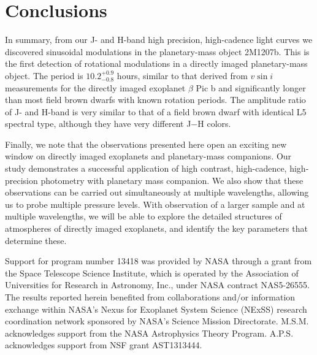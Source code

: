\documentclass[apj]{emulateapj}
\newcommand{\bpic}{$\beta$ Pic}
\newcommand{\vsini}{$v\sin i$}
\begin{document}
\section{Conclusions}
In summary, from our J- and H-band high precision, high-cadence light
curves we discovered sinusoidal modulations in the planetary-mass
object 2M1207b. This is the first detection of rotational modulations
in a directly imaged planetary-mass object.  The period is
$10.2^{+0.9}_{-0.8}$ hours, similar to that derived from \vsini{} 
measurements for the directly imaged exoplanet \bpic{} b and
significantly longer than most field brown dwarfs with known rotation
periods. The amplitude ratio of J- and H-band is very
similar to that of a field brown dwarf with identical L5 spectral type, although they have
very different J$-$H colors.

Finally, we note that the observations presented here open an exciting
new window on directly imaged exoplanets and planetary-mass
companions. Our study demonstrates a successful application of
high contrast, high-cadence, high-precision photometry with planetary
mass companion. We also show that these observations can be carried
out simultaneously at multiple wavelengths, allowing us to probe
multiple pressure levels. With observation of a larger sample and at
multiple wavelengths, we will be able to explore the detailed
structures of atmospheres of directly imaged exoplanets, and identify
the key parameters that determine these.

\acknowledgments

Support for program number 13418 was provided by NASA through a grant
from the Space Telescope Science Institute, which is operated by the
Association of Universities for Research in Astronomy, Inc., under
NASA contract NAS5-26555. The results reported herein benefited from
collaborations and/or information exchange within NASA's Nexus for
Exoplanet System Science (NExSS) research coordination network
sponsored by NASA's Science Mission Directorate. M.S.M. acknowledges
support from the NASA Astrophysics Theory Program. A.P.S. acknowledges
support from NSF grant AST1313444.

\end{document}
